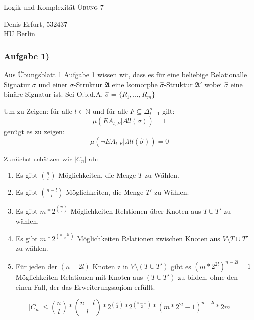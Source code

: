 \documentclass[12pt]{article}
\begin{document}
\begin{center}
\Large
Logik und Komplexität  \textsc{ Übung 7 }
\end{center}

\begin{flushright}
Denis Erfurt, 532437\\
HU Berlin \\

\vspace{2 mm}

\end{flushright}

\subsubsection*{Aufgabe 1)}

Aus Übungsblatt 1 Aufgabe 1 wissen wir, dass es für eine beliebige Relationalle
Signatur $\sigma$ und einer $\sigma$-Struktur $\mathfrak{A}$ eine Isomorphe 
$\hat \sigma$-Struktur $\mathfrak{A}'$ wobei $\hat \sigma$ eine binäre Signatur
ist. Sei O.b.d.A. $\hat \sigma = \{ R_1, ..., R_m\}$

Um zu Zeigen: für alle $l\in\mathbb{N}$ und für alle $F\subseteq 
\Delta_{l+1}^\sigma$ gilt:
\[ \mu(EA_{l,F}|All(\sigma)) = 1 \] 
genügt es zu zeigen:
\[ \mu(\neg EA_{l,F}|All(\hat \sigma)) = 0 \]

Zunächst schätzen wir $|C_n|$ ab:
\begin{enumerate}
  \item Es gibt ${n \choose l}$ Möglichkeiten, die Menge $T$ zu Wählen.
  \item Es gibt ${n-l \choose l}$ Möglichkeiten, die Menge $T'$ zu Wählen.
  \item Es gibt $m * 2^{2l \choose 2}$ Möglichkeiten Relationen über Knoten aus
    $T\cup T'$ zu wählen.
  \item Es gibt $m * 2^{n-2l \choose 2}$ Möglichkeiten Relationen zwischen 
    Knoten aus $V\setminus T \cup T'$ zu wählen.
  \item Für jeden der $(n-2l)$ Knoten z in $V\setminus (T\cup T')$ gibt es 
    $(m*2^{2l})^{n-2l}-1$ Möglichkeiten Relationen mit Knoten aus $(T\cup T')$ 
    zu bilden, ohne den einen Fall, der das Erweiterungsaqiom erfüllt.
\end{enumerate}

\[ |C_n| \leq {n\choose l} * {n-l \choose l} * 2^{2l \choose 2} * 
  2^{n-2l\choose 2} * ( m * 2^{2l} - 1 )^{ n - 2l } * 2m  \] 
\end{document}
